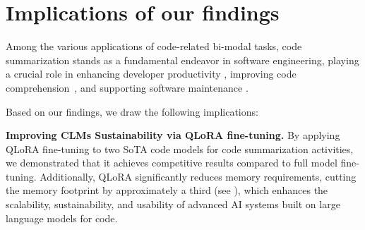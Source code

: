 \section{Implications of our findings} 
\label{sec:implications}



Among the various applications of code-related bi-modal tasks, code summarization stands as a fundamental endeavor in software engineering, playing a crucial role in enhancing developer productivity \cite{majdoub2024debugging, mastropaolo2021studying}, improving code comprehension~\cite{zhang2020retrieval, fang2024esale}, and supporting software maintenance \cite{yang2024multi}.

Based on our findings, we draw the following implications:

\smallskip


\noindent\textbf{Improving CLMs Sustainability via QLoRA fine-tuning.} By applying QLoRA fine-tuning to two SoTA code models for code summarization activities, we demonstrated that it achieves competitive results compared to full model fine-tuning. Additionally, QLoRA significantly reduces memory requirements, cutting the memory footprint by approximately a third (see ), which enhances the scalability, sustainability, and usability of advanced AI systems built on large language models for code. 


\smallskip


